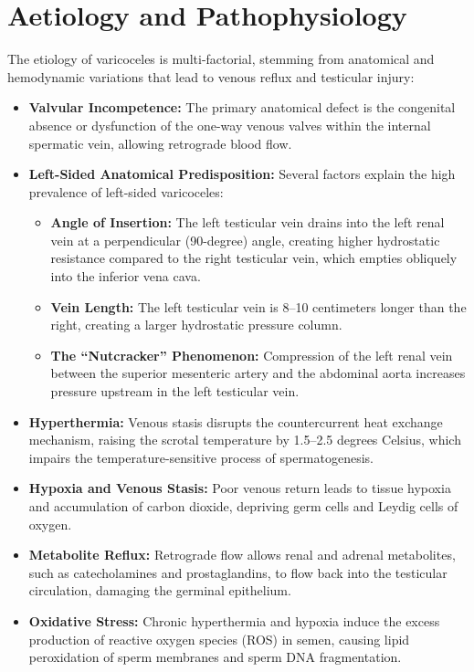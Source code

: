 \section*{Aetiology and Pathophysiology}
The etiology of varicoceles is multi-factorial, stemming from anatomical and hemodynamic variations that lead to venous reflux and testicular injury:
\begin{itemize}
  \item \textbf{Valvular Incompetence:} The primary anatomical defect is the congenital absence or dysfunction of the one-way venous valves within the internal spermatic vein, allowing retrograde blood flow.
  \item \textbf{Left-Sided Anatomical Predisposition:} Several factors explain the high prevalence of left-sided varicoceles:
  \begin{itemize}
    \item \textbf{Angle of Insertion:} The left testicular vein drains into the left renal vein at a perpendicular (90-degree) angle, creating higher hydrostatic resistance compared to the right testicular vein, which empties obliquely into the inferior vena cava.
    \item \textbf{Vein Length:} The left testicular vein is 8--10 centimeters longer than the right, creating a larger hydrostatic pressure column.
    \item \textbf{The ``Nutcracker'' Phenomenon:} Compression of the left renal vein between the superior mesenteric artery and the abdominal aorta increases pressure upstream in the left testicular vein.
  \end{itemize}
  \item \textbf{Hyperthermia:} Venous stasis disrupts the countercurrent heat exchange mechanism, raising the scrotal temperature by 1.5--2.5 degrees Celsius, which impairs the temperature-sensitive process of spermatogenesis.
  \item \textbf{Hypoxia and Venous Stasis:} Poor venous return leads to tissue hypoxia and accumulation of carbon dioxide, depriving germ cells and Leydig cells of oxygen.
  \item \textbf{Metabolite Reflux:} Retrograde flow allows renal and adrenal metabolites, such as catecholamines and prostaglandins, to flow back into the testicular circulation, damaging the germinal epithelium.
  \item \textbf{Oxidative Stress:} Chronic hyperthermia and hypoxia induce the excess production of reactive oxygen species (ROS) in semen, causing lipid peroxidation of sperm membranes and sperm DNA fragmentation.
\end{itemize}

